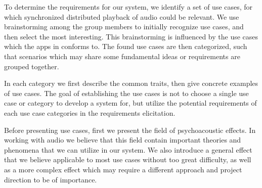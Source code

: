 To determine the requirements for our system, we identify a set of use cases, for which synchronized distributed playback of audio could be relevant.
We use brainstorming among the group members to initially recognize use cases, and then select the most interesting.
This brainstorming is influenced by the use cases which the apps in  conforms to.
The found use cases are then categorized, such that scenarios which may share some fundamental ideas or requirements are grouped together.

In each category we first describe the common traits, then give concrete examples of use cases.
The goal of establishing the use cases is not to choose a single use case or category to develop a system for, but utilize the potential requirements of each use case categories in the requirements elicitation.

Before presenting use cases, first we present the field of psychoacoustic effects.
In working with audio we believe that this field contain important theories and phenomena that we can utilize in our system.
We also introduce a general effect that we believe applicable to most use cases without too great difficulty, as well as a more complex effect which may require a different approach and project direction to be of importance.
